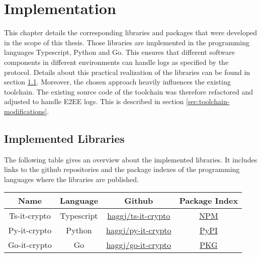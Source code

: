 \documentclass[../main.tex]{subfiles}
\begin{document}
\chapter{Implementation}
\label{chap:implementation}

This chapter details the corresponding libraries and packages that were developed in the scope of this thesis.
Those libraries are implemented in the programming languages Typescript, Python and Go.
This ensures that different software components in different environments can handle logs as specified by the protocol.
Details about this practical realization of the libraries can be found in section \ref{sec:implemented-libraries}.
Moreover, the chosen approach heavily influences the existing toolchain.
The existing source code of the toolchain was therefore refactored and adjusted to handle E2EE logs.
This is described in section \ref{sec:toolchain-modifications}.

\section{Implemented Libraries}
\label{sec:implemented-libraries}

The following table gives an overview about the implemented libraries.
It includes links to the github repositories and the package indexes of the programming languages where the libraries are published.

\begin{table}[ht]
    \centering
    \begin{tabular}{|c|c|c|c|}
    \hline
    Name         & Language & Github                           & Package Index                                    \\ \hline
    Ts-it-crypto & Typescript           & \href{https://github.com/haggj/ts-it-crypto}{haggj/ts-it-crypto} & \href{https://www.npmjs.com/package/ts-it-crypto}{NPM}       \\ \hline
    Py-it-crypto & Python               & \href{https://github.com/haggj/py-it-crypto}{haggj/py-it-crypto} & \href{https://pypi.org/project/py-it-crypto/}{PyPI}          \\ \hline
    Go-it-crypto & Go                   & \href{https://github.com/haggj/go-it-crypto}{haggj/go-it-crypto} & \href{https://pkg.go.dev/github.com/haggj/go-it-crypto}{PKG} \\ \hline
    \end{tabular}
\end{table}
\end{document}
